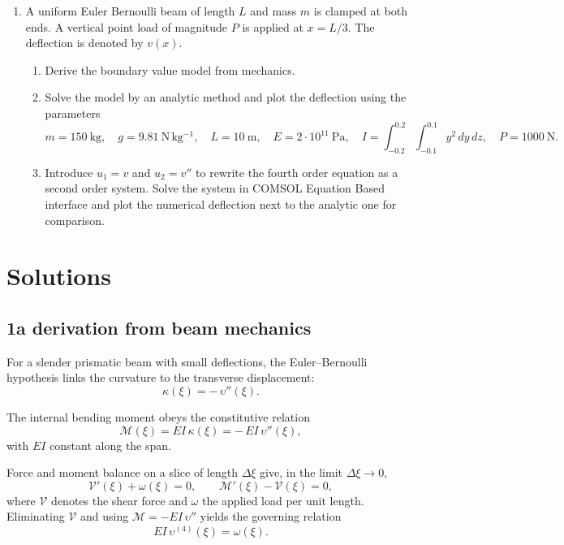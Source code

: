 \documentclass[12pt, a4paper]{article}
\begin{document}
\begin{enumerate}[leftmargin=1.2em,label=\arabic*.]
  \item A uniform Euler Bernoulli beam of length $L$ and mass $m$ is clamped at both ends.
  A vertical point load of magnitude $P$ is applied at $x=L/3$.
  The deflection is denoted by $v(x)$.
  \begin{enumerate}[label=\alph*)]
    \item Derive the boundary value model from mechanics.
    \item Solve the model by an analytic method and plot the deflection using the parameters
          \[
          m=150~\mathrm{kg},\quad g=9.81~\mathrm{N\,kg^{-1}},\quad L=10~\mathrm{m},\quad
          E=2\cdot 10^{11}~\mathrm{Pa},\quad
          I=\int_{-0.2}^{0.2}\!\int_{-0.1}^{0.1} y^{2}\,dy\,dz,\quad
          P=1000~\mathrm{N}.
          \]
    \item Introduce $u_{1}=v$ and $u_{2}=v''$ to rewrite the fourth order equation as a second order system.
          Solve the system in COMSOL Equation Based interface and plot the numerical deflection next to the analytic one for comparison.
  \end{enumerate}
\end{enumerate}

\newpage
\section*{Solutions}

\subsection*{1a \quad derivation from beam mechanics}

For a slender prismatic beam with small deflections, the Euler--Bernoulli hypothesis links the curvature to the transverse displacement:
\[
\kappa(\xi) = -\,\upsilon''(\xi).
\]

The internal bending moment obeys the constitutive relation
\[
\mathcal{M}(\xi) = E I \,\kappa(\xi) = -\,E I\,\upsilon''(\xi),
\]
with $E I$ constant along the span.

Force and moment balance on a slice of length $\Delta \xi$ give, in the limit $\Delta \xi \to 0$,
\[
\mathcal{V}'(\xi)+\omega(\xi)=0, 
\qquad 
\mathcal{M}'(\xi)-\mathcal{V}(\xi)=0,
\]
where $\mathcal{V}$ denotes the shear force and $\omega$ the applied load per unit length. Eliminating $\mathcal{V}$ and using $\mathcal{M}=-E I\,\upsilon''$ yields the governing relation
\[
E I\,\upsilon^{(4)}(\xi)=\omega(\xi).
\]
\end{document}
